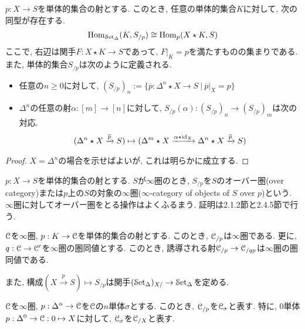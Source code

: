 \documentclass[uplatex, a4paper, 14Q, dvipdfmx]{jsreport}
\begin{document}
\begin{proposition} \label{prop.1.2.9.2}
  $p : X \to S$を単体的集合の射とする. 
  このとき, 任意の単体的集合$K$に対して, 次の同型が存在する. 
  \begin{align*}
    \mathrm{Hom}_{\mathcal{S}\mathrm{et}_{\Delta}}(K,S_{/p}) \cong \mathrm{Hom}_{p}(X \star K,S)
  \end{align*}
  ここで, 右辺は関手$F : X \star K \to S$であって, $F|_{K} = p$を満たすものの集まりである. 
  また, 単体的集合$S_{/ p}$は次のように定義される. 
  \begin{itemize}
    \item 任意の$n \geq 0$に対して, $(S_{/ p})_n := \{\overline{p} : \Delta^n \star X \to S ~|~ \overline{p}|_{X} = p\}$
    \item $\Delta^n$の任意の射$\alpha : [m] \to [n]$に対して, $S_{/ p}(\alpha) : (S_{/ p})_n \to (S_{/ p})_m$は次の対応. 
    \begin{align*}
      (\Delta^n \star X \xrightarrow{\overline{p}} S) \mapsto (\Delta^m \star X \xrightarrow{\alpha \star \mathrm{id}_X} \Delta^n \star X \xrightarrow{\overline{p}} S)
    \end{align*}
  \end{itemize}
\end{proposition}

\begin{proof}
  $X=\Delta^n$の場合を示せばよいが, これは明らかに成立する. 
\end{proof}

$p : X \to S$を単体的集合の射とする. 
$S$が$\infty$圏のとき, $S_{/ p}$を$S$のオーバー圏(over category)または$p$上の$S$の対象の$\infty$圏($\infty$-category of objects of $S$ over $p$)という.
$\infty$圏に対してオーバー圏をとる操作はよくふるまう. 
証明は2.1.2節と2.4.5節で行う.

\begin{proposition} \label{prop.1.2.9.3}
  $\mathcal{C}$を$\infty$圏, $p : K \to \mathcal{C}$を単体的集合の射とする. 
  このとき, $\mathcal{C}_{/p}$は$\infty$圏である.  
  更に, $q : \mathcal{C} \to \mathcal{C}'$を$\infty$圏の圏同値とする. 
  このとき, 誘導される射$\mathcal{C}_{/p} \to \mathcal{C}_{/qp}$は$\infty$圏の圏同値である. 
\end{proposition}

また, 構成$(X \xrightarrow{p} S) \mapsto S_{/ p}$は関手$(\mathcal{S}\mathrm{et}_{\Delta})_{X /} \to \mathcal{S}\mathrm{et}_{\Delta}$を定める.

\begin{remark} \label{rem.1.2.9.4}
  $\mathcal{C}$を$\infty$圏, $p : \Delta^n \to \mathcal{C}$を$\mathcal{C}$の$n$単体$\sigma$とする. 
  このとき, $\mathcal{C}_{/p}$を$\mathcal{C}_{\sigma}$と表す. 
  特に, $0$単体$p : \Delta^0 \to \mathcal{C} : 0 \mapsto X$に対して, $\mathcal{C}_{\sigma}$を$\mathcal{C}_{/X}$と表す. 
\end{remark}
\end{document}
